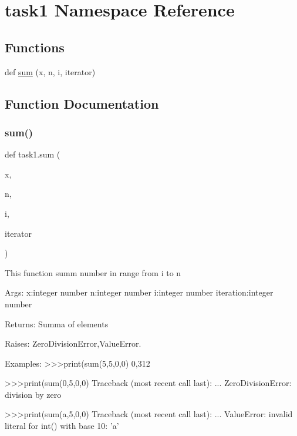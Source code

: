 \hypertarget{namespacetask1}{}\section{task1 Namespace Reference}
\label{namespacetask1}
\subsection*{Functions}
\begin{DoxyCompactItemize}
\item 
def \hyperlink{namespacetask1_af56f33ab4a6cbea7681f04efce2199d9}{sum} (x, n, i, iterator)
\end{DoxyCompactItemize}


\subsection{Function Documentation}
\mbox{\label{namespacetask1_af56f33ab4a6cbea7681f04efce2199d9}} 
\subsubsection{\texorpdfstring{sum()}{sum()}}
{\footnotesize\ttfamily def task1.\+sum (\begin{DoxyParamCaption}\item[{}]{x,  }\item[{}]{n,  }\item[{}]{i,  }\item[{}]{iterator }\end{DoxyParamCaption})}

\begin{DoxyVerb}This function summ number in range from i to n
  
Args:
    x:integer number
    n:integer number
    i:integer number
    iteration:integer number

Returns:
    Summa of elements

Raises:
    ZeroDivisionError,ValueError.
    
Examples:
    >>>print(sum(5,5,0,0)
    0,312
    
    >>>print(sum(0,5,0,0)
    Traceback (most recent call last):
      ...
    ZeroDivisionError: division by zero
    
    >>>print(sum(a,5,0,0)
    Traceback (most recent call last):
      ...
    ValueError: invalid literal for int() with base 10: 'a'
\end{DoxyVerb}
 